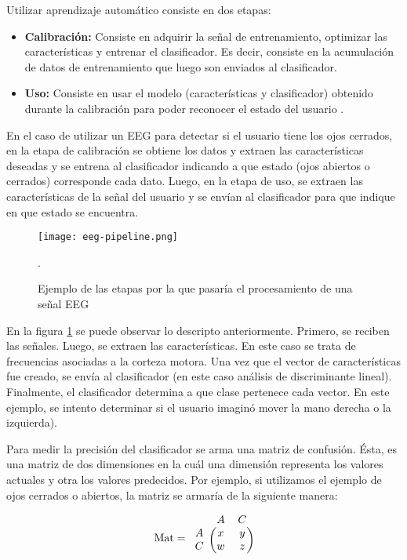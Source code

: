 Utilizar aprendizaje automático consiste en dos etapas:

\begin{itemize}
	\item \textbf{Calibración:} Consiste en adquirir la señal de entrenamiento, optimizar las características y entrenar el clasificador. Es decir, consiste en la acumulación de datos de entrenamiento que luego son enviados al clasificador.
	\item \textbf{Uso:} Consiste en usar el modelo (características y clasificador) obtenido durante la calibración para poder reconocer el estado del usuario \cite{eeg-tutorial}. 
\end{itemize}

En el caso de utilizar un EEG para detectar si el usuario tiene los ojos cerrados, en la etapa de calibración se obtiene los datos y extraen las características deseadas y se entrena al clasificador indicando a que estado (ojos abiertos o cerrados) corresponde cada dato. Luego, en la etapa de uso, se extraen las características de la señal del usuario y se envían al clasificador para que indique en que estado se encuentra.

\begin{figure}[H]
	\centering
    \texttt{[image: eeg-pipeline.png]}
    \caption{Ejemplo de las etapas por la que pasaría el procesamiento de una señal EEG \cite{eeg-tutorial}}.
	\label{fig:eeg-pipeline}
\end{figure}

En la figura \ref{fig:eeg-pipeline} se puede observar lo descripto anteriormente. Primero, se reciben las señales. Luego, se extraen las características. En este caso se trata de frecuencias asociadas a la corteza motora. Una vez que el vector de características fue creado, se envía al clasificador (en este caso análisis de discriminante lineal). Finalmente, el clasificador determina a que clase pertenece cada vector. En este ejemplo, se intento determinar si el usuario imaginó mover la mano derecha o la izquierda). 

Para medir la precisión del clasificador se arma una matriz de confusión. Ésta, es una matriz de dos dimensiones en la cuál una dimensión representa los valores actuales y otra los valores predecidos. Por ejemplo, si utilizamos el ejemplo de ojos cerrados o abiertos, la matriz se armaría de la siguiente manera:

\[
\textrm{Mat} = \begin{blockarray}{ccc}
& A & C \\
\begin{block}{c(cc)}
  A & x & y \\
  C & w & z \\
\end{block}
\end{blockarray}
 \]
 
